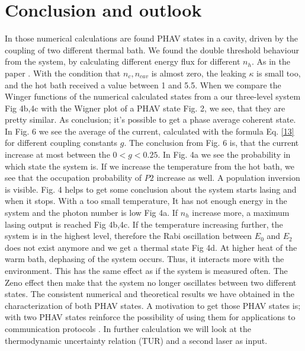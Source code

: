 \documentclass[12pt,a4paper]{article}
\begin{document}
\section{Conclusion and outlook}
In those numerical calculations are found PHAV states in a cavity, driven by the coupling of two different thermal bath. We found the double threshold behaviour from the system, by calculating different energy flux for different $n_h$. As in the paper \cite{Li2017}.
With the condition that $n_c, n_{cav}$ is almost zero, the leaking $\kappa$ is small too, and the hot bath received a value between 1 and 5.5. When we compare the Winger functions of the numerical calculated states from a our three-level system Fig 4b,4c with the Wigner plot of a PHAV state Fig. 2, we see, that they are pretty similar. As conclusion; it's possible to get a phase average coherent state. 
In Fig. 6 we see the average of the current, calculated with the formula Eq. \eqref{13} for different coupling constants $g$.
The conclusion from Fig. 6 is, that the current increase at most between the $ 0<g<0.25$.
In Fig. 4a we see the probability in which state the  system is. If we increase the temperature from the hot bath, we see that the occupation probability of $P2$ increase as well. A  population  inversion is visible.
Fig. 4 helps to get some conclusion about the system starts lasing and when it stops. With a too small temperature, It has not enough energy in the system and the photon number is low Fig 4a. If $n_h$ increase more, a maximum lasing output is reached  Fig 4b,4c. If the temperature increasing further, the system is in the highest level, therefore the Rabi oscillation between $E_0$ and $E_2$ does not exist anymore and we get a thermal state Fig 4d.
At higher heat of the warm bath, dephasing of the system occurs. Thus, it interacts more with the environment. This has the same effect as if the system is measured often. The Zeno effect then make that the system no longer oscillates between two different states. 
The consistent numerical and theoretical results we have obtained in the characterization of both PHAV states.
A motivation to get those PHAV states is; with two PHAV states reinforce the
possibility of using them for applications to communication protocols \cite{Allevi2013}.
In further calculation  we will look at the thermodynamic uncertainty relation (TUR) and a second laser as input.
\printbibliography
\end{document}
